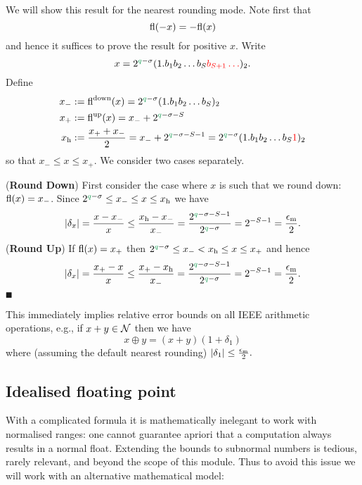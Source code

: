 We will show this result for the nearest rounding mode. Note first that
\[
{\rm fl}(-x) = -{\rm fl}(x)
\]
and hence it suffices to prove the result for positive $x$. Write
\[
x = 2^{\green{q}-\ensuremath{\sigma}} (1.b_1b_2\ensuremath{\ldots}b_S\red{b_{S+1}\ensuremath{\ldots}})_2.
\]
Define
\begin{align*}
x_- &:= {\rm fl}^{\rm down}(x) = 2^{\green{q}-\ensuremath{\sigma}} (1.b_1b_2\ensuremath{\ldots}b_S)_2 \\
x_+ &:= {\rm fl}^{\rm up}(x) = x_- + 2^{\green{q}-\ensuremath{\sigma}-S} \\
x_{\rm h} &:= {x_+ + x_- \over 2} = x_- + 2^{\green{q}-\ensuremath{\sigma}-S-1} = 2^{\green{q}-\ensuremath{\sigma}} (1.b_1b_2\ensuremath{\ldots}b_S\red{1})_2
\end{align*}
so that $x_- \ensuremath{\leq} x \ensuremath{\leq} x_+$. We consider two cases separately.

(\textbf{Round Down}) First consider the case where $x$ is such that we round down: ${\rm fl}(x) = x_-$. Since $2^{\green{q}-\ensuremath{\sigma}} \ensuremath{\leq} x_- \ensuremath{\leq} x \ensuremath{\leq} x_{\rm h}$ we have
\[
|\ensuremath{\delta}_x| = {x - x_- \over x} \ensuremath{\leq} {x_{\rm h} - x_- \over x_-} = {2^{\green{q}-\ensuremath{\sigma}-S-1} \over 2^{\green{q}-\ensuremath{\sigma}}} = 2^{-S-1} = {\ensuremath{\epsilon}_{\rm m} \over 2}.
\]
(\textbf{Round Up}) If ${\rm fl}(x) = x_+$ then $2^{\green{q}-\ensuremath{\sigma}} \ensuremath{\leq} x_- < x_{\rm h} \ensuremath{\leq} x \ensuremath{\leq} x_+$ and hence
\[
|\ensuremath{\delta}_x| = {x_+ - x \over x} \ensuremath{\leq} {x_+ - x_{\rm h} \over x_-} = {2^{\green{q}-\ensuremath{\sigma}-S-1} \over 2^{\green{q}-\ensuremath{\sigma}}} = 2^{-S-1} = {\ensuremath{\epsilon}_{\rm m} \over 2}.
\]
\ensuremath{\QED}

This immediately implies relative error bounds on all IEEE arithmetic operations, e.g., if $x+y \in {\cal N}$ then we have
\[
x \ensuremath{\oplus} y = (x+y) (1 + \ensuremath{\delta}_1)
\]
where (assuming the default nearest rounding) $|\ensuremath{\delta}_1| \ensuremath{\leq} {\ensuremath{\epsilon}_{\rm m} \over 2}.$

\subsection{Idealised floating point}
With a complicated formula it is mathematically inelegant to work with normalised ranges: one cannot guarantee apriori that a computation always results in a normal float. Extending the bounds to subnormal numbers is tedious, rarely relevant, and beyond the scope of this module. Thus to avoid this issue we will work with an alternative mathematical model:

